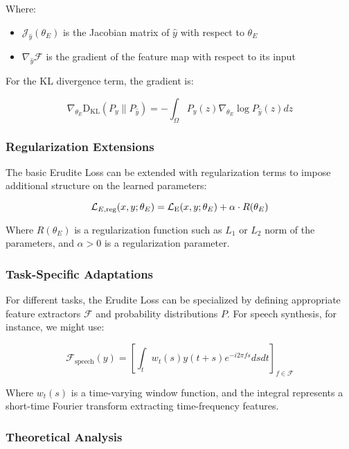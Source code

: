 Where:
\begin{itemize}
\item $\mathcal{J}_{\hat{y}}(\theta_E)$ is the Jacobian matrix of $\hat{y}$ with respect to $\theta_E$
\item $\nabla_{\hat{y}} \mathcal{F}$ is the gradient of the feature map with respect to its input
\end{itemize}

For the KL divergence term, the gradient is:

\begin{equation}
\nabla_{\theta_E} \mathrm{D_{KL}}(P_y \| P_{\hat{y}}) = -\int_{\Omega} P_y(z) \nabla_{\theta_E} \log P_{\hat{y}}(z) dz
\end{equation}

\subsubsection{Regularization Extensions}

The basic Erudite Loss can be extended with regularization terms to impose additional structure on the learned parameters:

\begin{equation}
\mathcal{L}_{E,\text{reg}}(x, y; \theta_E) = \mathcal{L}_{\text{E}}(x, y; \theta_E) + \alpha \cdot R(\theta_E)
\end{equation}

Where $R(\theta_E)$ is a regularization function such as $L_1$ or $L_2$ norm of the parameters, and $\alpha > 0$ is a regularization parameter.

\subsubsection{Task-Specific Adaptations}

For different tasks, the Erudite Loss can be specialized by defining appropriate feature extractors $\mathcal{F}$ and probability distributions $P$. For speech synthesis, for instance, we might use:

\begin{equation}
\mathcal{F}_{\text{speech}}(y) = \left[ \int_t w_t(s) y(t+s) e^{-i2\pi fs} dsdt \right]_{f \in \mathcal{F}}
\end{equation}

Where $w_t(s)$ is a time-varying window function, and the integral represents a short-time Fourier transform extracting time-frequency features.

\subsubsection{Theoretical Analysis}

